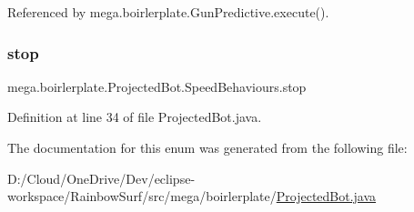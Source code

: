 Referenced by mega.\+boirlerplate.\+Gun\+Predictive.\+execute().

\mbox{\label{enummega_1_1boirlerplate_1_1_projected_bot_1_1_speed_behaviours_a5797ddfe19110af68499cfd3d3400fc9}} 
\subsubsection{\texorpdfstring{stop}{stop}}
{\footnotesize\ttfamily mega.\+boirlerplate.\+Projected\+Bot.\+Speed\+Behaviours.\+stop}



Definition at line 34 of file Projected\+Bot.\+java.



The documentation for this enum was generated from the following file\+:\begin{DoxyCompactItemize}
\item 
D\+:/\+Cloud/\+One\+Drive/\+Dev/eclipse-\/workspace/\+Rainbow\+Surf/src/mega/boirlerplate/\hyperlink{_projected_bot_8java}{Projected\+Bot.\+java}\end{DoxyCompactItemize}
